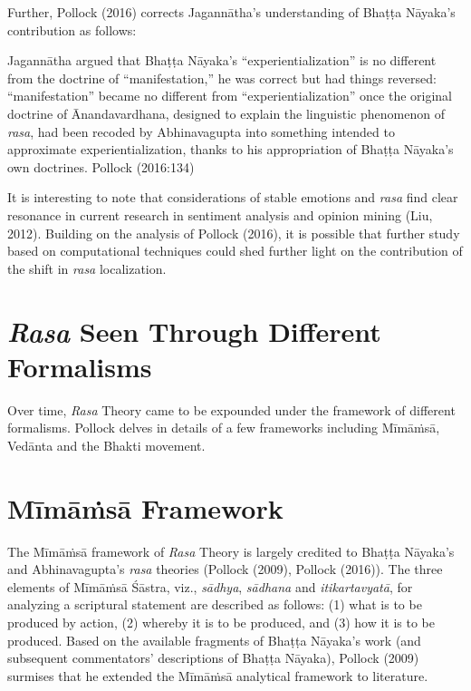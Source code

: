 Further, Pollock (2016) corrects Jagannātha’s understanding of Bhaṭṭa Nāyaka’s contribution as follows:

\begin{myquote}
Jagannātha argued that Bhaṭṭa Nāyaka’s “experientialization” is no different from the doctrine of “manifestation,” he was correct but had things reversed: “manifestation” became no different from “experientialization” once the original doctrine of Ānandavardhana, designed to explain the linguistic phenomenon of \textsl{rasa}, had been recoded by Abhinavagupta into something intended to approximate experientialization, thanks to his appropriation of Bhaṭṭa Nāyaka’s own doctrines.
\hfill Pollock (2016:134)
\end{myquote}

It is interesting to note that considerations of stable emotions and \textsl{rasa} find clear resonance in current research in sentiment analysis and opinion mining (Liu, 2012). Building on the analysis of Pollock (2016), it is possible that further study based on computational techniques could shed further light on the contribution of the shift in \textsl{rasa} localization.\\[-20pt] 

\section*{\textsl{Rasa} Seen Through Different Formalisms}

Over time, \textsl{Rasa} Theory came to be expounded under the framework of different formalisms. Pollock delves in details of a few frameworks including Mīmāṁsā, Vedānta and the Bhakti movement.\\[-20pt]

\section*{Mīmāṁsā Framework}

The Mīmāṁsā framework of \textsl{Rasa} Theory is largely credited to Bhaṭṭa Nāyaka’s and Abhinavagupta’s \textsl{rasa} theories (Pollock (2009), Pollock (2016)). The three elements of Mīmāṁsā Śāstra, viz., \textsl{sādhya}, \textsl{sādhana} and \textsl{itikartavyatā}, for analyzing a scriptural statement are described as follows: (1) what is to be produced by action, (2) whereby it is to be produced, and (3) how it is to be produced. Based on the available fragments of Bhaṭṭa Nāyaka’s work (and subsequent commentators’ descriptions of Bhaṭṭa Nāyaka), Pollock (2009) surmises that he extended the Mīmāṁsā analytical framework to literature. 

